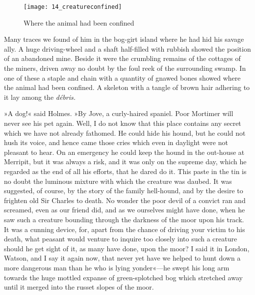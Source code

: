 \begin{figure}[h!]
\centering
\texttt{[image: 14\_creatureconfined]}
\caption{Where the animal had been confined}
\end{figure}

Many traces we found of him in the bog-girt island where he had hid his savage ally. A huge driving-wheel and a shaft half-filled with rubbish showed the position of an abandoned mine. Beside it were the crumbling remains of the cottages of the miners, driven away no doubt by the foul reek of the surrounding swamp. In one of these a staple and chain with a quantity of gnawed bones showed where the animal had been confined. A skeleton with a tangle of brown hair adhering to it lay among the \textit{débris.}

»A dog!« said Holmes. »By Jove, a curly-haired spaniel. Poor Mortimer will never see his pet again. Well, I do not know that this place contains any secret which we have not already fathomed. He could hide his hound, but he could not hush its voice, and hence came those cries which even in daylight were not pleasant to hear. On an emergency he could keep the hound in the out-house at Merripit, but it was always a risk, and it was only on the supreme day, which he regarded as the end of all his efforts, that he dared do it. This paste in the tin is no doubt the luminous mixture with which the creature was daubed. It was suggested, of course, by the story of the family hell-hound, and by the desire to frighten old Sir Charles to death. No wonder the poor devil of a convict ran and screamed, even as our friend did, and as we ourselves might have done, when he saw such a creature bounding through the darkness of the moor upon his track. It was a cunning device, for, apart from the chance of driving your victim to his death, what peasant would venture to inquire too closely into such a creature should he get sight of it, as many have done, upon the moor? I said it in London, Watson, and I say it again now, that never yet have we helped to hunt down a more dangerous man than he who is lying yonder«—he swept his long arm towards the huge mottled expanse of green-splotched bog which stretched away until it merged into the russet slopes of the moor.